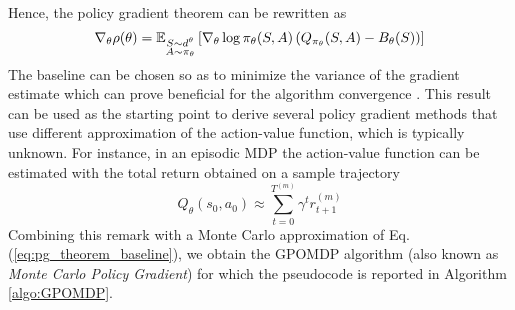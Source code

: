Hence, the policy gradient theorem can be rewritten as 
\begin{equation}
\label{eq:pg_theorem_baseline}
	\nabla_\theta \rho(\theta) =
	\E[\substack{S \sim d^\theta\\A \sim \pi_\theta}]{\nabla_\theta\log
	\pi_\theta(S,A) \left(Q_{\pi_\theta}(S, A) - B_\theta(S)\right)}
\end{equation}
The baseline can be chosen so as to minimize the variance of the gradient estimate which can prove beneficial for the algorithm convergence \cite{peters2008reinforcement}. This result can be used as the starting point to derive several policy gradient methods that use different approximation of the action-value function, which is typically unknown. For instance, in an episodic MDP the action-value function can be estimated with the total return obtained on a sample trajectory
\begin{equation}
	Q_\theta(s_0,a_0) \approx \sum_{t=0}^{T^{(m)}} \gamma^t r_{t+1}^{(m)}
\end{equation}
Combining this remark with a Monte Carlo approximation of Eq. (\ref{eq:pg_theorem_baseline}), we obtain the GPOMDP algorithm \cite{baxter2001infinite} (also known as \emph{Monte Carlo Policy Gradient}) for which the pseudocode is reported in Algorithm \ref{algo:GPOMDP}.
